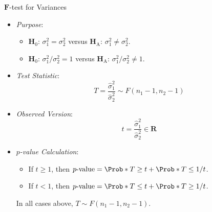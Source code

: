 \begin{Statistical_Test}{$ \symbf{F} $-test for Variances}{}
    \begin{itemize}
        \item \emph{Purpose}:
              \begin{itemize}
                  \item $ \mathbf{H}_0 $: $ \sigma_1^2=\sigma_2^2 $ versus $ \mathbf{H}_\text{A} $: $ \sigma_1^2\ne \sigma_2^2 $.
                  \item $ \mathbf{H}_0 $: $ \sigma_1^2/\sigma_2^2=1 $ versus $ \mathbf{H}_\text{A} $: $ \sigma_1^2/\sigma_2^2\ne 1 $.
              \end{itemize}
        \item \emph{Test Statistic}:
              \[ T=\frac{\hat{\sigma}_1^2}{\hat{\sigma}_2^2}\sim F(n_1-1,n_2-1)  \]
        \item \emph{Observed Version}:
              \[ t=\frac{\hat{\sigma}_1^2}{\hat{\sigma}_2^2}\in\mathbf{R}   \]
        \item \emph{$ p $-value Calculation}:
              \begin{itemize}
                  \item If $ t\ge 1 $, then $ p\text{-value}=\Prob*{T\ge t}+\Prob*{T\le 1/t} $.
                  \item If $ t<1 $, then $ p\text{-value}=\Prob*{T\le t}+\Prob*{T\ge 1/t} $.
              \end{itemize}
              \begin{Remark}{}{}
                  In all cases above, $ T \sim F(n_1-1,n_2-1) $.
              \end{Remark}
    \end{itemize}
\end{Statistical_Test}
